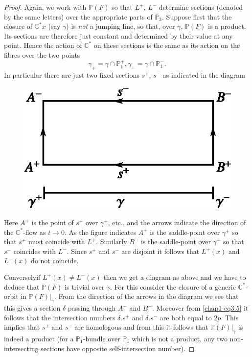 \begin{proof}
Again, we work with $\mathbb{P}(F)$ so that $L^{+}$, $L^{-}$ determine
sections (denoted by the same letters) over the appropriate parts of
$\mathbb{P}_{3}$. Suppose first that the closure of $\mathbb{C}^{*}x$
(say $\gamma$) is {\em not} a jumping line, so that, over $\gamma$,
$\mathbb{P}(F)$ is a product. Its sections are therefore just constant
and determined by their value at any point. Hence the action of
$\mathbb{C}^{*}$ on these sections is the same as its action on the
fibres over the two points
$$
\gamma_{+}=\gamma \cap \mathbb{P}^{+}_{1}, \gamma_{-}=\gamma\cap
\mathbb{P}^{-}_{1}. 
$$
In particular there are just two fixed sections $s^{+}$, $s^{-}$ as
indicated in the diagram
\begin{figure}[H]
\centering
\includegraphics{figures/chap1-fig1.eps}
\end{figure}

Here $A^{+}$ is the point of $s^{+}$ over $\gamma^{+}$, etc., and the
arrows indicate the direction of the $\mathbb{C}^{*}$-flow as $t\to
0$. As the figure indicates $A^{+}$ is the saddle-point over
$\gamma^{+}$ so that $s^{+}$ must coincide with $L^{+}$. Similarly
$B^{-}$ is the saddle-point over $\gamma^{-}$ so that $s^{-}$
coincides with $L^{-}$. Since $s^{+}$ and $s^{-}$ are disjoint it
follows that $L^{+}(x)$ and $L^{-}(x)$ do not coincide. 

Conversely\pageoriginale if $L^{+}(x)\neq L^{-}(x)$ then we get a
diagram as above and we have to deduce that $\mathbb{P}(F)$ is trivial
over $\gamma$. For this consider the closure of a generic
$\mathbb{C}^{*}$-orbit in $\mathbb{P}(F)|_{\gamma}$. From the direction
of the arrows in the diagram we see that this gives a section $\delta$
passing through $A^{-}$ and $B^{+}$. Moreover from \eqref{chap1-eq3.5}
it follows that the intersection numbers $\delta.s^{+}$ and
$\delta.s^{-}$ are both equal to $2p$. This implies that $s^{+}$ and
$s^{-}$ are homologous and from this it follows that
$\mathbb{P}(F)|_{\gamma}$ is indeed a product (for a
$\mathbb{P}_{1}$-bundle over $\mathbb{P}_{1}$ which is not a product,
any two non-intersecting sections have opposite self-intersection
number).


\end{proof}
